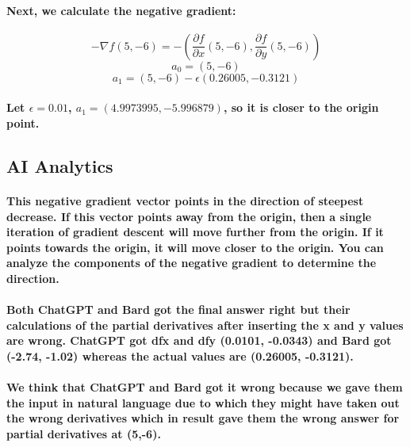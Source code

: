 \documentclass[11pt]{article} %
\begin{document}
\paragraph{Next, we calculate the negative gradient:}
% 
$$
    -\nabla f(5, -6) = -\left(\frac{\partial f}{\partial x}(5, -6), \frac{\partial f}{\partial y}(5, -6)\right)
$$
% 
% 
$$ a_0 = (5,-6) $$
$$ a_1 = (5,-6)-\epsilon (0.26005,-0.3121) $$
% 
\paragraph{Let $\epsilon=0.01$, $a_1=(4.9973995,-5.996879)$, so it is closer to the origin point.}
% 
\subsection{AI Analytics}
\paragraph{This negative gradient vector points in the direction of steepest decrease. If this vector points away from the origin, then a single iteration of gradient descent will move further from the origin. If it points towards the origin, it will move closer to the origin. You can analyze the components of the negative gradient to determine the direction.}
% 
% 
\paragraph{Both ChatGPT and Bard got the final answer right but their calculations of the partial derivatives after inserting the x and y values are wrong. ChatGPT got dfx and dfy (0.0101, -0.0343) and Bard got (-2.74, -1.02) whereas the actual values are (0.26005, -0.3121). }
\paragraph{We think that ChatGPT and Bard got it wrong because we gave them the input in natural language due to which they might have taken out the wrong derivatives which in result gave them the wrong answer for partial derivatives at (5,-6).}
% 
% 
% 
% 
% 
% 
% 
% 
\end{document}
